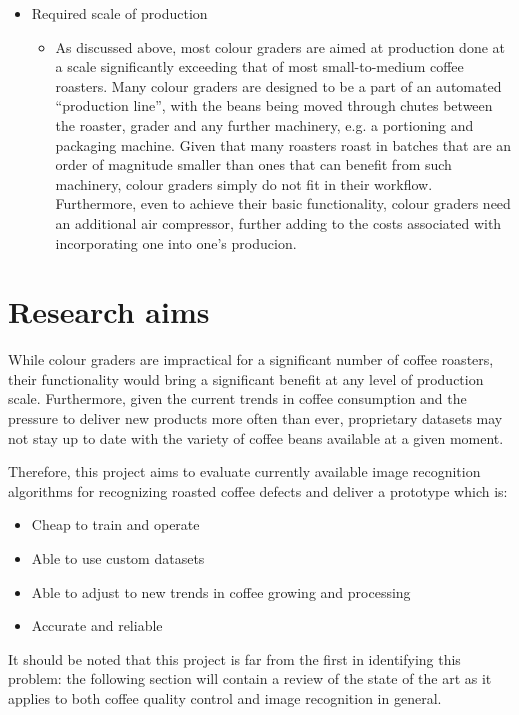\begin{itemize}
	\item Required scale of production
		\begin{itemize}
			\item As discussed above, most colour graders are aimed at production done
				at a scale significantly exceeding that of most small-to-medium coffee
				roasters. Many colour graders are designed to be a part of an automated ``production
				line'', with the beans being moved through chutes between the roaster, grader
				and any further machinery, e.g. a portioning and packaging machine.
				Given that many roasters roast in batches that are an order of magnitude
				smaller than ones that can benefit from such machinery, colour graders simply
				do not fit in their workflow. Furthermore, even to achieve their basic functionality,
				colour graders need an additional air compressor, further adding to the costs
				associated with incorporating one into one's producion.
		\end{itemize}
\end{itemize}

\section{Research aims}
\label{sec:research-aims}
While colour graders are impractical for a significant
number of coffee roasters, their functionality would bring a significant benefit
at any level of production scale.
Furthermore, given the current trends in coffee
consumption and the pressure to deliver new products more often than ever,
proprietary datasets may not stay up to date with the variety of coffee beans available at
a given moment.

Therefore, this project aims to evaluate currently available image recognition algorithms
for recognizing roasted coffee defects and deliver a prototype which is:
\begin{itemize}
	\item Cheap to train and operate

	\item Able to use custom datasets

	\item Able to adjust to new trends in coffee growing and processing

	\item Accurate and reliable
\end{itemize}

It should be noted that this project is far from the first in identifying this problem:
the following section will contain a review of the state of the art as it applies to both
coffee quality control and image recognition in general.

